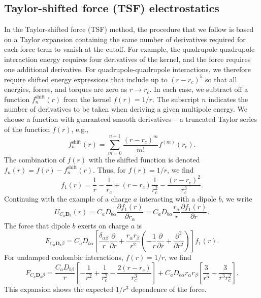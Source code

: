 \subsection{Taylor-shifted force (TSF) electrostatics}
In the Taylor-shifted force (TSF) method, the procedure that we follow
is based on a Taylor expansion containing the same number of
derivatives required for each force term to vanish at the cutoff.  For
example, the quadrupole-quadrupole interaction energy requires four
derivatives of the kernel, and the force requires one additional
derivative. For quadrupole-quadrupole interactions, we therefore
require shifted energy expressions that include up to $(r-r_c)^5$ so
that all energies, forces, and torques are zero as $r \rightarrow
r_c$. In each case, we subtract off a function $f_n^{\text{shift}}(r)$
from the kernel $f(r)=1/r$.  The subscript $n$ indicates the number of
derivatives to be taken when deriving a given multipole energy.  We
choose a function with guaranteed smooth derivatives -- a truncated
Taylor series of the function $f(r)$, e.g.,
%
\begin{equation}
f_n^{\text{shift}}(r)=\sum_{m=0}^{n+1} \frac {(r-r_c)^m}{m!} f^{(m)}(r_c)  .
\end{equation}
%
The combination of $f(r)$ with the shifted function is denoted $f_n(r)=f(r)-f_n^{\text{shift}}(r)$.
Thus, for $f(r)=1/r$, we find
%
\begin{equation}
f_1(r)=\frac{1}{r}- \frac{1}{r_c} + (r - r_c) \frac{1}{r_c^2} - \frac{(r-r_c)^2}{r_c^3} .
\end{equation}
%
Continuing with the example of a charge $a$ interacting with a
dipole $b$, we write
%
\begin{equation}
U_{C_a\mathbf{D}_b}(r)=
C_a D_{b\alpha}  \frac {\partial f_1(r) }{\partial r_\alpha} 
= C_a D_{b\alpha}
\frac {r_\alpha}{r} \frac {\partial f_1(r)}{\partial r} .
\end{equation}
%
The force that dipole  $ b$ exerts on charge $a$ is
%
\begin{equation}
F_{C_a \mathbf{D}_b \beta} = C_a D_{b \alpha}
\left[ \frac{\delta_{\alpha\beta}}{r} \frac {\partial}{\partial r} + 
\frac{r_\alpha r_\beta}{r^2}
\left( -\frac{1}{r} \frac {\partial} {\partial r} 
+ \frac {\partial ^2} {\partial r^2} \right) \right] f_1(r) .
\end{equation}
%
For undamped coulombic interactions, $f(r)=1/r$, we find
%
\begin{equation}
F_{C_a \mathbf{D}_b \beta} =
\frac{C_a D_{b\beta}}{r}
\left[  -\frac{1}{r^2}+\frac{1}{r_c^2}-\frac{2(r-r_c)}{r_c^3} \right] 
+C_a D_{b \alpha}r_\alpha r_\beta 
\left[ \frac{3}{r^5}-\frac{3}{r^3r_c^2} \right] .
\end{equation}
%
This expansion shows the expected $1/r^3$ dependence of the force.  

